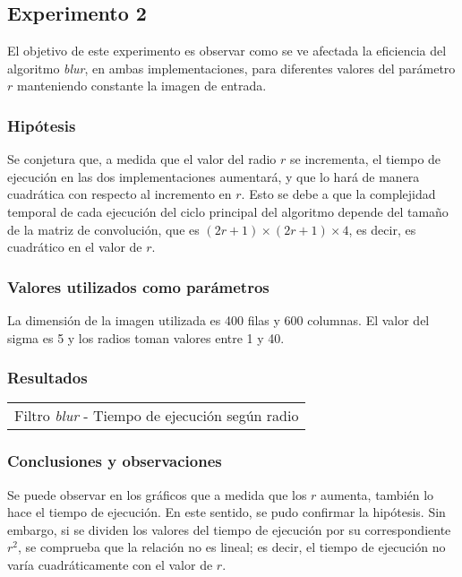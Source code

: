 	\subsection{Experimento 2}
		El objetivo de este experimento es observar como se ve afectada la eficiencia del algoritmo \emph{blur}, en ambas implementaciones, para diferentes valores del parámetro $r$ manteniendo constante la imagen de entrada.

		\subsubsection*{Hipótesis} 
			Se conjetura que, a medida que el valor del radio $r$ se incrementa, el tiempo de ejecución en las dos implementaciones aumentará, y que lo hará de manera cuadrática con respecto al incremento en $r$. Esto se debe a que la complejidad temporal de cada ejecución del ciclo principal del algoritmo depende del tamaño de la matriz de convolución, que es $(2r + 1) \times (2r + 1) \times 4$, es decir, es cuadrático en el valor de $r$.

		\subsubsection*{Valores utilizados como parámetros} 
		La dimensión de la imagen utilizada es 400 filas y 600 columnas. El valor del sigma es 5 y los radios toman valores entre 1 y 40.

		\subsubsection*{Resultados}

			{\centering \begin{tabular}{c}
	      		{\small Filtro \emph{blur} - Tiempo de ejecución según radio} \\
	    	\end{tabular}}

		\subsubsection*{Conclusiones y observaciones}
			Se puede observar en los gráficos que a medida que los $r$ aumenta, también lo hace el tiempo de ejecución. En este sentido, se pudo confirmar la hipótesis. Sin embargo, si se dividen los valores del tiempo de ejecución por su correspondiente $r^2$, se comprueba que la relación no es lineal; es decir, el tiempo de ejecución no varía cuadráticamente con el valor de $r$.


